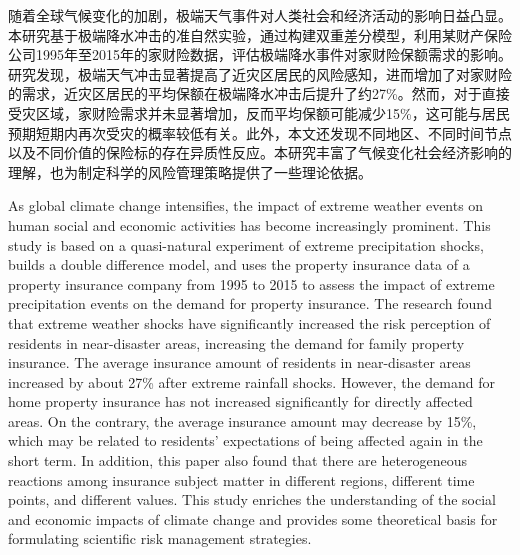 \begin{cabstract}
    随着全球气候变化的加剧，极端天气事件对人类社会和经济活动的影响日益凸显。本研究基于极端降水冲击的准自然实验，通过构建双重差分模型，利用某财产保险公司1995年至2015年的家财险数据，评估极端降水事件对家财险保额需求的影响。研究发现，极端天气冲击显著提高了近灾区居民的风险感知，进而增加了对家财险的需求，近灾区居民的平均保额在极端降水冲击后提升了约27\%。然而，对于直接受灾区域，家财险需求并未显著增加，反而平均保额可能减少15\%，这可能与居民预期短期内再次受灾的概率较低有关。此外，本文还发现不同地区、不同时间节点以及不同价值的保险标的存在异质性反应。本研究丰富了气候变化社会经济影响的理解，也为制定科学的风险管理策略提供了一些理论依据。
\end{cabstract}
\begin{eabstract}
    As global climate change intensifies, the impact of extreme weather events on human social and economic activities has become increasingly prominent. This study is based on a quasi-natural experiment of extreme precipitation shocks, builds a double difference model, and uses the property insurance data of a property insurance company from 1995 to 2015 to assess the impact of extreme precipitation events on the demand for property insurance. The research found that extreme weather shocks have significantly increased the risk perception of residents in near-disaster areas, increasing the demand for family property insurance. The average insurance amount of residents in near-disaster areas increased by about 27\% after extreme rainfall shocks. However, the demand for home property insurance has not increased significantly for directly affected areas. On the contrary, the average insurance amount may decrease by 15\%, which may be related to residents' expectations of being affected again in the short term. In addition, this paper also found that there are heterogeneous reactions among insurance subject matter in different regions, different time points, and different values. This study enriches the understanding of the social and economic impacts of climate change and provides some theoretical basis for formulating scientific risk management strategies.
\end{eabstract}
